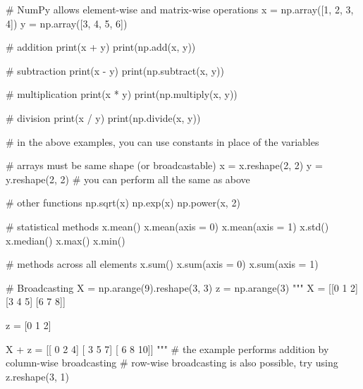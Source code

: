 \begin{python}
	# NumPy allows element-wise and matrix-wise operations
	x = np.array([1, 2, 3, 4])
	y = np.array([3, 4, 5, 6])
	
	# addition
	print(x + y)
	print(np.add(x, y))
	
	# subtraction
	print(x - y)
	print(np.subtract(x, y))
	
	# multiplication
	print(x * y)
	print(np.multiply(x, y))
	
	# division
	print(x / y)
	print(np.divide(x, y))
	
	# in the above examples, you can use constants in place of the variables
	
	# arrays must be same shape (or broadcastable)
	x = x.reshape(2, 2)
	y = y.reshape(2, 2)
	# you can perform all the same as above
	
	# other functions
	np.sqrt(x)
	np.exp(x)
	np.power(x, 2)
	
	# statistical methods
	x.mean()
	x.mean(axis = 0)
	x.mean(axis = 1)
	x.std()
	x.median()
	x.max()
	x.min()
	
	# methods across all elements
	x.sum()
	x.sum(axis = 0)
	x.sum(axis = 1)
	
	# Broadcasting
	X = np.arange(9).reshape(3, 3)
	z = np.arange(3)
	"""
	X =
	[[0 1 2]
	[3 4 5]
	[6 7 8]]
	
	z =
	[0 1 2]
	
	X + z =
	[[ 0  2  4]
	[ 3  5  7]
	[ 6  8 10]]
	"""
	# the example performs addition by column-wise broadcasting
	# row-wise broadcasting is also possible, try using z.reshape(3, 1)
\end{python}